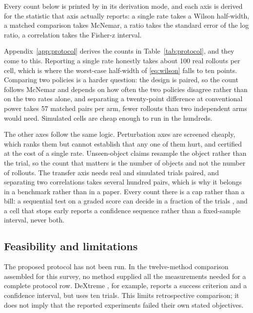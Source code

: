 \label{subsec:protocol}
Every count below is printed by  in its derivation mode, and each
axis is derived for the statistic that axis actually reports: a single rate takes a Wilson
half-width, a matched comparison takes McNemar, a ratio takes the standard error of the log ratio,
a correlation takes the Fisher-z interval.

Appendix~\ref{app:protocol} derives the counts in Table~\ref{tab:protocol}, and they come to
this. Reporting a single rate honestly takes about 100 real rollouts per cell, which is where the
worst-case half-width of \eqref{eq:wilson} falls to ten points. Comparing two policies is a harder
question: the design is paired, so the count follows McNemar and depends on how often the two
policies disagree rather than on the two rates alone, and separating a twenty-point difference at
conventional power takes 57 matched pairs per arm, fewer rollouts than two independent arms would
need. Simulated cells are cheap enough to run in the hundreds.

The other axes follow the same logic. Perturbation axes are screened cheaply, which ranks them but
cannot establish that any one of them hurt, and certified at the cost of a single rate.
Unseen-object claims resample the object rather than the trial, so the count that matters is the
number of objects and not the number of rollouts. The transfer axis needs real and simulated
trials paired, and separating two correlations takes several hundred pairs, which is why it belongs
in a benchmark rather than in a paper. Every count there is a cap rather than a bill: a sequential
test on a graded score can decide in a fraction of the trials
\cite{beyond_binary_success_2026}, and a cell that stops early reports a confidence sequence rather
than a fixed-sample interval, never both.


\subsection{Feasibility and limitations}
\label{subsec:matrix}

The proposed protocol has not been run. In the twelve-method comparison assembled for this
survey, no method supplied all the measurements needed for a complete protocol row. DeXtreme
\cite{dextreme_2022}, for example, reports a success criterion and a confidence interval, but
uses ten trials. This limits retrospective comparison; it does not imply that the reported
experiments failed their own stated objectives.

